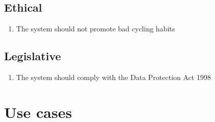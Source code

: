 \documentclass[a4paper]{report}
\begin{document}
\subsection{Ethical}
\label{ethical}
\begin{enumerate}[label=\ref*{ethical}.\arabic*.,leftmargin=*]
\item The system should not promote bad cycling habits
\end{enumerate}
\subsection{Legislative}
\label{legislative}
\begin{enumerate}[label=\ref*{legislative}.\arabic*.,leftmargin=*]
\item The system should comply with the Data Protection Act 1998
\end{enumerate}

\section{Use cases}
\label{sec:use-cases}
\end{document}

